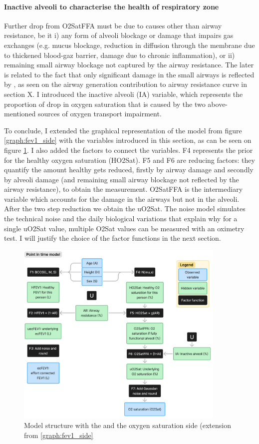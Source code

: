 \paragraph{Inactive alveoli to characterise the health of respiratory zone}
Further drop from O2SatFFA must be due to causes other than airway resistance, be it i) any form of alveoli blockage or damage that impairs gas exchanges (e.g. mucus blockage, reduction in diffusion through the membrane due to thickened blood-gaz barrier, damage due to chronic inflammation), or ii) remaining small airway blockage not captured by the airway resistance. The later is related to the fact that only significant damage in the small airways is reflected by \F, as seen on the airway generation contribution to airway resistance curve in section X.  I introduced the inactive alveoli (IA) variable, which represents the proportion of drop in oxygen saturation that is caused by the two above-mentioned sources of oxygen transport impairment.

To conclude, I extended the graphical representation of the model from figure \ref{graph:fev1_side} with the variables introduced in this section, as can be seen on figure \ref{graph:o2_side}. I also added the factors to connect the variables. F4 represents the prior for the healthy oxygen saturation (HO2Sat). F5 and F6 are reducing factors: they quantify the amount healthy \OXSat gets reduced, firstly by airway damage and secondly by alveoli damage (and remaining small airway blockage not reflected by the airway resistance), to obtain the \OXSat measurement. O2SatFFA is the intermediary variable which accounts for the damage in the airways but not in the alveoli. After the two step reduction we obtain the uO2Sat. The noise model simulates the technical noise and the daily biological variations that explain why for a single uO2Sat value, multiple O2Sat values can be measured with an oximetry test. I will justify the choice of the factor functions in the next section.

\begin{figure}[!h]
    \centering
    \includegraphics[width=100mm]{Chapter1/Figs/o2_sat_model_structure.png}
    \caption{Model structure with the \F and the oxygen saturation side (extension from \ref{graph:fev1_side}}
    \label{graph:o2_side}
\end{figure}

